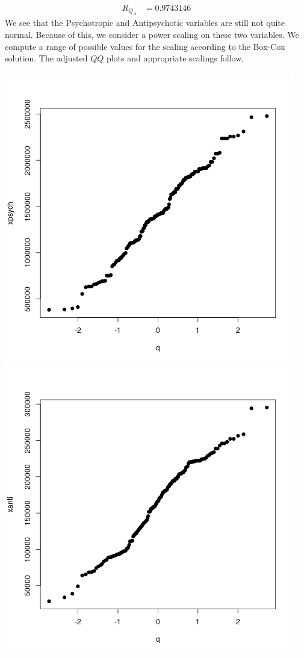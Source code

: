 \documentclass[letterpaper,10pt]{article}
\begin{document}
\begin{enumerate}
\begin{align*}
R_{Q_A} &= 0.9743146
\end{align*}
We see that the Psychotropic and Antipsychotic variables are still not quite normal. Because of this, we consider a power scaling on these two variables. We compute a range of possible values for the scaling according to the Box-Cox solution. The adjusted $QQ$ plots and appropriate scalings follow,
\begin{center}
\includegraphics[scale=.5]{scalepq.png}
\includegraphics[scale=.5]{scaleaq.png}

\end{center}
\end{enumerate}
\end{document}
